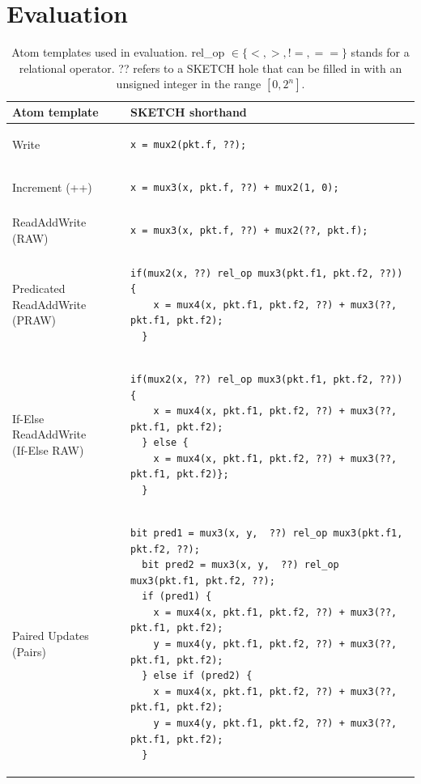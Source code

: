 \section{Evaluation}
\label{s:eval}

\begin{table}[!t]
  \begin{scriptsize}
  \begin{tabular}{|p{}|p{}|}
  \hline
  Atom template & SKETCH shorthand\\
  \hline
  Write &
  {\begin{lstlisting}[style=customctable]
  x = mux2(pkt.f, ??);
  \end{lstlisting}} \\
  \hline
  Increment (++) &
  {\begin{lstlisting}[style=customctable]
  x = mux3(x, pkt.f, ??) + mux2(1, 0);
  \end{lstlisting}} \\
  \hline
  ReadAddWrite (RAW) &
  {\begin{lstlisting}[style=customctable]
  x = mux3(x, pkt.f, ??) + mux2(??, pkt.f);
  \end{lstlisting}} \\
  \hline
  \pbox{0.15\textwidth}
  {Predicated\\
  ReadAddWrite (PRAW)} &
  {\begin{lstlisting}[style=customctable]
  if(mux2(x, ??) rel_op mux3(pkt.f1, pkt.f2, ??)) {
    x = mux4(x, pkt.f1, pkt.f2, ??) + mux3(??, pkt.f1, pkt.f2);
  }
  \end{lstlisting}} \\
  \hline
  \pbox{0.15\textwidth}
  {If-Else\\
   ReadAddWrite\\
   (If-Else RAW)} &
  {\begin{lstlisting}[style=customctable]
  if(mux2(x, ??) rel_op mux3(pkt.f1, pkt.f2, ??)) {
    x = mux4(x, pkt.f1, pkt.f2, ??) + mux3(??, pkt.f1, pkt.f2);
  } else {
    x = mux4(x, pkt.f1, pkt.f2, ??) + mux3(??, pkt.f1, pkt.f2)};
  }
  \end{lstlisting}} \\
  \hline
  Paired Updates (Pairs) &
  {\begin{lstlisting}[style=customctable]
  bit pred1 = mux3(x, y,  ??) rel_op mux3(pkt.f1, pkt.f2, ??);
  bit pred2 = mux3(x, y,  ??) rel_op mux3(pkt.f1, pkt.f2, ??);
  if (pred1) {
    x = mux4(x, pkt.f1, pkt.f2, ??) + mux3(??, pkt.f1, pkt.f2);
    y = mux4(y, pkt.f1, pkt.f2, ??) + mux3(??, pkt.f1, pkt.f2);
  } else if (pred2) {
    x = mux4(x, pkt.f1, pkt.f2, ??) + mux3(??, pkt.f1, pkt.f2);
    y = mux4(y, pkt.f1, pkt.f2, ??) + mux3(??, pkt.f1, pkt.f2);
  }
  \end{lstlisting}} \\
  \hline
  \end{tabular}
\end{scriptsize}
  \caption{Atom templates used in evaluation. rel\_op $\in \{<, >, != , ==\}$ stands for a relational operator. ?? refers to a SKETCH hole that can be filled in with an unsigned integer in the range $[0, 2^n]$.}
  \label{tab:templates}
\end{table}

